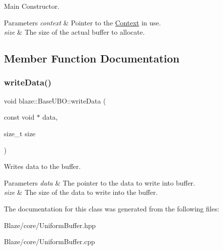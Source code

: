 Main Constructor. 


\begin{DoxyParams}{Parameters}
{\em context} & Pointer to the \hyperlink{classblaze_1_1Context}{Context} in use. \\
\hline
{\em size} & The size of the actual buffer to allocate. \\
\hline
\end{DoxyParams}


\subsection{Member Function Documentation}
\mbox{\label{classblaze_1_1BaseUBO_a76859304045ec034ea2cffe68ea1db65}} 
\subsubsection{\texorpdfstring{write\+Data()}{writeData()}}
{\footnotesize\ttfamily void blaze\+::\+Base\+U\+B\+O\+::write\+Data (\begin{DoxyParamCaption}\item[{const void $\ast$}]{data,  }\item[{size\+\_\+t}]{size }\end{DoxyParamCaption})\hspace{0.3cm}{\ttfamily [protected]}}



Writes data to the buffer. 


\begin{DoxyParams}{Parameters}
{\em data} & The pointer to the data to write into buffer. \\
\hline
{\em size} & The size of the data to write into the buffer. \\
\hline
\end{DoxyParams}


The documentation for this class was generated from the following files\+:\begin{DoxyCompactItemize}
\item 
Blaze/core/Uniform\+Buffer.\+hpp\item 
Blaze/core/Uniform\+Buffer.\+cpp\end{DoxyCompactItemize}

